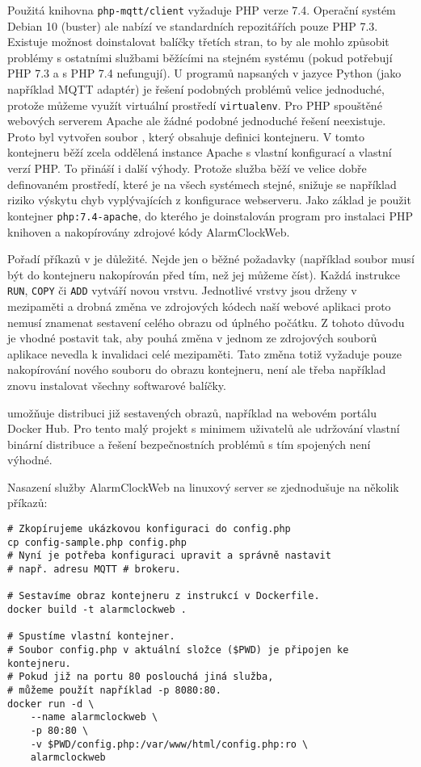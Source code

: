 Použitá knihovna \texttt{php-mqtt/client} vyžaduje PHP verze 7.4. Operační
systém Debian 10 (buster) ale nabízí ve standardních repozitářích pouze PHP
7.3. Existuje možnost doinstalovat balíčky třetích stran, to by ale mohlo
způsobit problémy s ostatními službami běžícími na stejném systému (pokud
potřebují PHP 7.3 a s PHP 7.4 nefungují).
U programů napsaných v jazyce Python (jako například MQTT adaptér) je řešení
podobných problémů velice jednoduché, protože můžeme využít virtuální prostředí
\texttt{virtualenv}. Pro PHP spouštěné webových serverem Apache ale žádné
podobné jednoduché řešení neexistuje.
Proto byl vytvořen soubor , který obsahuje definici
kontejneru. V tomto kontejneru běží zcela oddělená instance Apache s vlastní
konfigurací a vlastní verzí PHP. To přináší i další výhody. Protože služba běží
ve velice dobře definovaném prostředí, které je na všech systémech stejné,
snižuje se například riziko výskytu chyb vyplývajících z konfigurace
webserveru. Jako základ je použit kontejner \texttt{php:7.4-apache}, do kterého
je doinstalován program pro instalaci PHP knihoven 
a nakopírovány zdrojové kódy AlarmClockWeb.

Pořadí příkazů v  je důležité. Nejde jen o běžné požadavky
(například soubor musí být do kontejneru nakopírován před tím, než jej můžeme
číst). Každá instrukce \texttt{RUN}, \texttt{COPY} či \texttt{ADD} vytváří
novou vrstvu. Jednotlivé vrstvy jsou drženy v mezipaměti a drobná změna ve
zdrojových kódech naší webové aplikaci proto nemusí znamenat sestavení celého
obrazu od úplného počátku. Z tohoto důvodu je vhodné postavit
 tak, aby pouhá změna v jednom ze zdrojových souborů
aplikace nevedla k invalidaci celé mezipaměti. Tato změna totiž vyžaduje pouze
nakopírování nového souboru do obrazu kontejneru, není ale třeba například
znovu instalovat všechny softwarové balíčky.

 umožňuje distribuci již sestavených obrazů, například na
webovém portálu Docker Hub. Pro tento malý projekt s minimem uživatelů ale
udržování vlastní binární distribuce a řešení bezpečnostních problémů s tím
spojených není výhodné.


Nasazení služby AlarmClockWeb na linuxový server se zjednodušuje na několik
příkazů:
\begin{lstlisting}[language=mybash,style=numbers]
# Zkopírujeme ukázkovou konfiguraci do config.php
cp config-sample.php config.php
# Nyní je potřeba konfiguraci upravit a správně nastavit
# např. adresu MQTT # brokeru.

# Sestavíme obraz kontejneru z instrukcí v Dockerfile.
docker build -t alarmclockweb .

# Spustíme vlastní kontejner.
# Soubor config.php v aktuální složce ($PWD) je připojen ke kontejneru.
# Pokud již na portu 80 poslouchá jiná služba,
# můžeme použít například -p 8080:80.
docker run -d \
    --name alarmclockweb \
    -p 80:80 \
    -v $PWD/config.php:/var/www/html/config.php:ro \
    alarmclockweb
\end{lstlisting}

